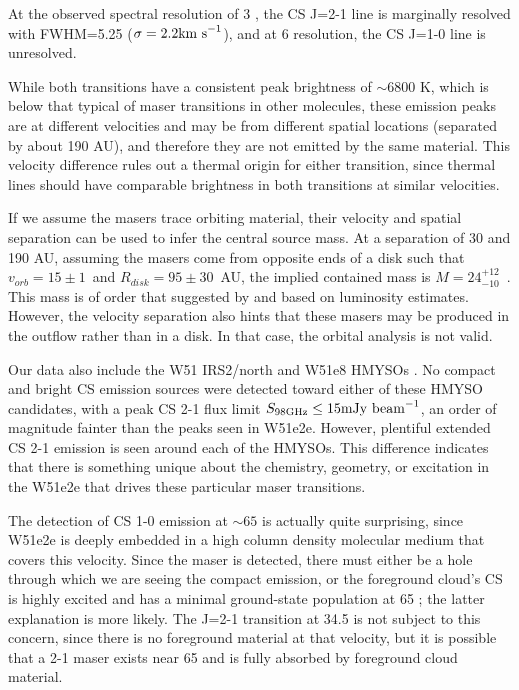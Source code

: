 \documentclass[twocolumn]{aastex62}
\begin{document}
At the observed spectral resolution of 3 \kms, the CS J=2-1 line is marginally
resolved with FWHM=5.25 \kms ($\sigma=2.2 \textrm{km~s}^{-1}$), and at 6 \kms resolution, the
CS J=1-0 line is unresolved.

While both transitions have a consistent peak brightness of $\sim6800$ K,
which is below that typical of maser transitions in other molecules, these
emission peaks are at different velocities and may be from different spatial
locations (separated
by about 190 AU), and therefore they are not emitted by the same material.
This velocity difference rules out a thermal origin for either transition,
since thermal lines should have comparable brightness in both transitions
at similar velocities.

If we assume the masers trace orbiting material, their velocity and spatial
separation can be used to infer the central source mass.  At a separation of 30
\kms and 190 AU, assuming the masers come from opposite ends of a disk such
that $v_{orb}=15\pm1$~\kms and $R_{disk}=95\pm30$~AU, the implied contained mass is
$M=24_{-10}^{+12}$~\msun.  This mass is of order that suggested by
\citet{Ginsburg2017a} and \citet{Goddi2018a} based on luminosity estimates.
However, the velocity separation also hints that these masers may be produced
in the outflow rather than in a disk.  In that case, the orbital analysis
is not valid.


Our data also include the W51 IRS2/north and W51e8 HMYSOs
\citep{Ginsburg2017a}.  No compact and bright CS emission sources were detected
toward either of these HMYSO candidates, with a peak CS 2-1 flux limit ${S_{98
\mathrm{GHz}} \leq 15 \mathrm{mJy~\textrm{beam}^{-1}}}$, an order of magnitude fainter
than the peaks seen in W51e2e.  However, plentiful extended CS 2-1 emission is
seen around each of the HMYSOs.  This difference indicates that there is
something unique about the chemistry, geometry, or excitation in the W51e2e
that drives these particular maser transitions.

The detection of CS 1-0 emission at $\sim65$ \kms is actually quite surprising,
since W51e2e is deeply embedded in a high column density molecular medium that
covers this velocity.  Since the maser is detected, there must either be a hole
through which we are seeing the compact emission, or the foreground cloud's CS
is highly excited and has a minimal ground-state population at 65 \kms; the
latter explanation is more likely.  The J=2-1 transition at 34.5 \kms is not
subject to this concern, since there is no foreground material at that
velocity, but it is possible that a 2-1 maser exists near 65 \kms and is fully
absorbed by foreground cloud material.
\end{document}
